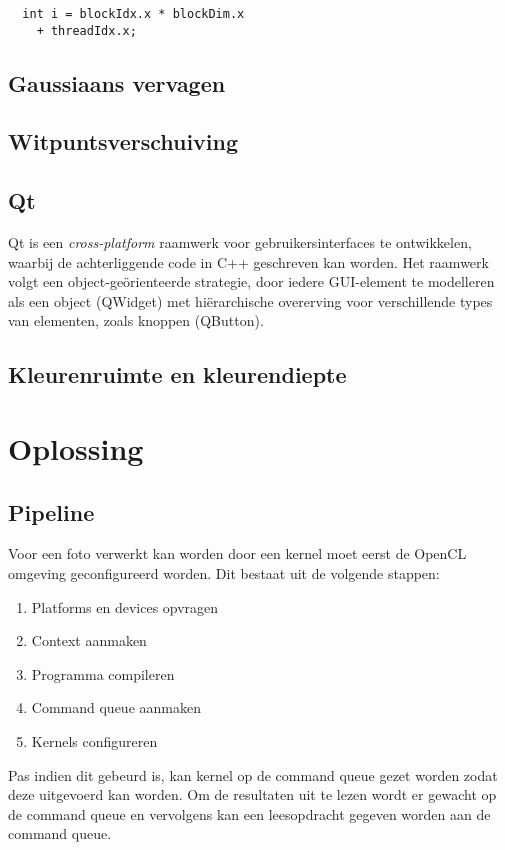 \documentclass[twocolumn, a4paper]{article}
\begin{document}

\begin{verbatim}
  int i = blockIdx.x * blockDim.x 
    + threadIdx.x;
\end{verbatim}
\label{c:index}

\subsection{Gaussiaans vervagen}

\subsection{Witpuntsverschuiving}

\subsection{Qt}
Qt is een \emph{cross-platform} raamwerk voor gebruikersinterfaces te ontwikkelen, waarbij de achterliggende code in C++ geschreven kan worden. Het raamwerk volgt een object-geörienteerde strategie, door iedere GUI-element te modelleren als een object (QWidget) met hiërarchische overerving voor verschillende types van elementen, zoals knoppen (QButton).

\subsection{Kleurenruimte en kleurendiepte}

\section{Oplossing}

\subsection{Pipeline}
Voor een foto verwerkt kan worden door een kernel moet eerst de OpenCL omgeving geconfigureerd worden. Dit bestaat uit de volgende stappen:

\begin{enumerate}
    \item Platforms en devices opvragen 
    \item Context aanmaken
    \item Programma compileren
    \item Command queue aanmaken
    \item Kernels configureren
\end{enumerate}
Pas indien dit gebeurd is, kan kernel op de command queue gezet worden zodat deze uitgevoerd kan worden. Om de resultaten uit te lezen wordt er gewacht op de command queue en vervolgens kan een leesopdracht gegeven worden aan de command queue. 
\end{document}
